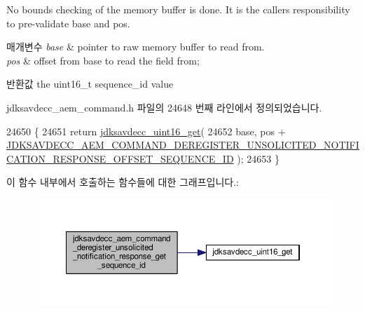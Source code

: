 No bounds checking of the memory buffer is done. It is the caller\textquotesingle{}s responsibility to pre-\/validate base and pos.


\begin{DoxyParams}{매개변수}
{\em base} & pointer to raw memory buffer to read from. \\
\hline
{\em pos} & offset from base to read the field from; \\
\hline
\end{DoxyParams}
\begin{DoxyReturn}{반환값}
the uint16\+\_\+t sequence\+\_\+id value 
\end{DoxyReturn}


jdksavdecc\+\_\+aem\+\_\+command.\+h 파일의 24648 번째 라인에서 정의되었습니다.


\begin{DoxyCode}
24650 \{
24651     \textcolor{keywordflow}{return} \hyperlink{group__endian_ga3fbbbc20be954aa61e039872965b0dc9}{jdksavdecc\_uint16\_get}(
24652         base, pos + 
      \hyperlink{group__command__deregister__unsolicited__notification__response_ga5703b706228a25db84041ff7806cff4f}{JDKSAVDECC\_AEM\_COMMAND\_DEREGISTER\_UNSOLICITED\_NOTIFICATION\_RESPONSE\_OFFSET\_SEQUENCE\_ID}
       );
24653 \}
\end{DoxyCode}


이 함수 내부에서 호출하는 함수들에 대한 그래프입니다.\+:
\nopagebreak
\begin{figure}[H]
\begin{center}
\leavevmode
\includegraphics[width=350pt]{group__command__deregister__unsolicited__notification__response_gab41619543d0908e3c5084f4849b96ad8_cgraph}
\end{center}
\end{figure}


